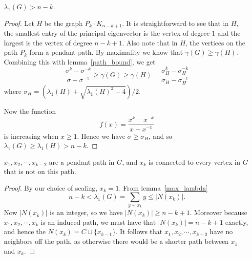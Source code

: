 \begin{lemma}\label{max_lambda}
  $\lambda_1(G) > n-k$.
\end{lemma}
\begin{proof}
  Let $H$ be the graph $P_k \cdot K_{n-k+1}$. It is straightforward to see that in $H$, the smallest entry of the principal eigenvector is the vertex of degree $1$ and the largest is the vertex of degree $n-k+1$. Also note that in $H$, the vertices on the path $P_k$ form a pendant path.
  By maximality we know that $\gamma(G) \geq \gamma(H)$.
  Combining this with lemma~\ref{path_bound}, we get
   \[ \frac{\sigma^k - \sigma^{-k}}{\sigma - \sigma^{-1}} \geq \gamma(G) \geq \gamma(H) =  \frac{\sigma_H^{k} - \sigma_H^{-k}}{\sigma_H - \sigma_H^{-1}} \]
  where $\sigma_H = \left(\lambda_1(H) + \sqrt{\lambda_1(H)^2 - 4}\right) /2$.

  \noindent Now the function
   \[ f(x) = \frac{x^k - x^{-k}}{x - x^{-1}}\]
  is increasing when $x \geq 1$.
  Hence we have
  $\sigma \geq \sigma_H$, and so
  $\lambda_1(G) \geq \lambda_1(H) > n-k$.
\end{proof}

\begin{lemma}\label{connect_every}
  $x_1, x_2, \cdots, x_{k-2}$ are a pendant path in $G$, and $x_k$
  is connected to every vertex in $G$ that is not on this
  path.
\end{lemma}
\begin{proof}
  By our choice of scaling, $x_k = 1$.  From lemma~\ref{max_lambda}
   \[ n-k < \lambda_1(G) = \sum_{y \sim  x_k} y \leq |N(x_k)|. \]
  Now $|N(x_k)|$ is an integer, so we have $|N(x_k)| \geq n-k+1$.
  Moreover because $x_1, x_2, \cdots, x_k$ is an induced path, we
  must have that $|N(x_k)| = n-k+1$ exactly, and hence the
  $N(x_k) = C \cup \{ x_{k-1} \}$.  It follows that $x_1, x_2, \cdots, x_{k-3}$
  have no neighbors off the path, as otherwise there would be a shorter
  path between $x_1$ and $x_k$.
\end{proof}

